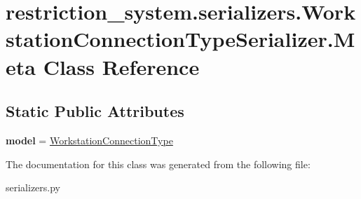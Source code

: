 \hypertarget{classrestriction__system_1_1serializers_1_1WorkstationConnectionTypeSerializer_1_1Meta}{}\section{restriction\+\_\+system.\+serializers.\+Workstation\+Connection\+Type\+Serializer.\+Meta Class Reference}
\label{classrestriction__system_1_1serializers_1_1WorkstationConnectionTypeSerializer_1_1Meta}
\subsection*{Static Public Attributes}
\begin{DoxyCompactItemize}
\item 
\hypertarget{classrestriction__system_1_1serializers_1_1WorkstationConnectionTypeSerializer_1_1Meta_acf639fb666ae77f92d24c9859b281d20}{}{\bfseries model} = \hyperlink{classrestriction__system_1_1models_1_1WorkstationConnectionType}{Workstation\+Connection\+Type}\label{classrestriction__system_1_1serializers_1_1WorkstationConnectionTypeSerializer_1_1Meta_acf639fb666ae77f92d24c9859b281d20}

\end{DoxyCompactItemize}


The documentation for this class was generated from the following file\+:\begin{DoxyCompactItemize}
\item 
serializers.\+py\end{DoxyCompactItemize}
